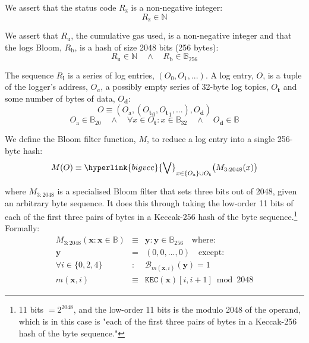 \documentclass[9pt,oneside]{amsart}
\makeatletter
\newcommand{\linkdest}[1]{\Hy@raisedlink{\hypertarget{#1}{}}}
\makeatother
\begin{document}
\begin{multicols}{2}
\linkdest{R__z_assert}We assert that the status code $R_{\mathrm{z}}$ is a non-negative integer:
\begin{equation}
R_{\mathrm{z}} \in \mathbb{N}
\end{equation}

\linkdest{R__u_assert}We assert that $R_{\mathrm{u}}$, the cumulative gas used, is a non-negative integer and that the logs Bloom, $R_{\mathrm{b}}$, is a hash of size 2048 bits (256 bytes):
\begin{equation}
R_{\mathrm{u}} \in \mathbb{N} \quad \wedge \quad R_{\mathrm{b}} \in \mathbb{B}_{256}
\end{equation}


The sequence $R_{\mathbf{l}}$ is a series of log entries, $(O_0, O_1, ...)$. A log entry, $O$, is a tuple of the logger's address, $O_a$, a possibly empty series of 32-byte log topics, $O_{\mathbf{t}}$ and some number of bytes of data, $O_{\mathbf{d}}$:
\begin{equation}
O \equiv (O_{\mathrm{a}}, ({O_{\mathbf{t}}}_0, {O_{\mathbf{t}}}_1, ...), O_{\mathbf{d}})
\end{equation}
\begin{equation}
O_{\mathrm{a}} \in \mathbb{B}_{20} \quad \wedge \quad \forall x \in O_{\mathbf{t}}: x \in \mathbb{B}_{32} \quad \wedge \quad O_{\mathbf{d}} \in \mathbb{B}
\end{equation}

We define the Bloom filter function, $M$, to reduce a log entry into a single 256-byte hash:
\begin{equation}
M(O) \equiv \hyperlink{bigvee}{\bigvee}_{x \in \{O_{\mathrm{a}}\} \cup O_{\mathbf{t}}} \big( M_{3:2048}(x) \big)
\end{equation}

where $M_{3:2048}$ is a specialised Bloom filter that sets three bits out of 2048, given an arbitrary byte sequence. It does this through taking the low-order 11 bits of each of the first three pairs of bytes in a Keccak-256 hash of the byte sequence.\footnote{11 bits $= 2^{2048}$, and the low-order 11 bits is the modulo 2048 of the operand, which is in this case is "each of the first three pairs of bytes in a Keccak-256 hash of the byte sequence."} Formally:
\begin{eqnarray}
M_{3:2048}(\mathbf{x}: \mathbf{x} \in \mathbb{B}) & \equiv & \mathbf{y}: \mathbf{y} \in \mathbb{B}_{256} \quad \text{where:}\\
\mathbf{y} & = & (0, 0, ..., 0) \quad \text{except:}\\
\forall i \in \{0, 2, 4\}&:&\mathcal{B}_{m(\mathbf{x}, i)}(\mathbf{y}) = 1\\
m(\mathbf{x}, i) &\equiv& \mathtt{KEC}(\mathbf{x})[i, i + 1] \bmod 2048
\end{eqnarray}


\end{multicols}
\end{document}
